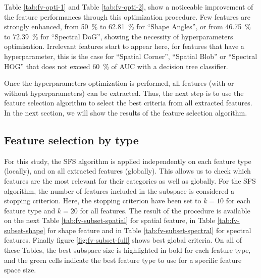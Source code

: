 \documentclass[../thesis.tex]{subfiles}
\begin{document}
    Table \ref{tab:fv-opti-1} and Table \ref{tab:fv-opti-2}, show a noticeable improvement of the feature performances through this optimization procedure. Few features are strongly enhanced, from \SI{50}{\percent} to \SI{62.81}{\percent} for ``Shape Angles'', or from \SI{46.75}{\percent} to \SI{72.39}{\percent} for ``Spectral DoG'', showing the necessity of hyperparameters optimisation. Irrelevant features start to appear here, for features that have a hyperparameter, this is the case for ``Spatial Corner'', ``Spatial Blob'' or ``Spectral HOG'' that does not exceed \SI{60}{\percent} of AUC with a decision tree classifier.
    
    Once the hyperparameters optimization is performed, all features (with or without hyperparameters) can be extracted. Thus, the next step is to use the feature selection algorithm to select the best criteria from all extracted features. In the next section, we will show the results of the feature selection algorithm.
    
    \subsection{Feature selection by type}
    
    For this study, the SFS algorithm is applied independently on each feature type (locally), and on all extracted features (globally). This allows us to check which features are the most relevant for their categories as well as globally. For the SFS algorithm, the number of features included in the subspace is considered a stopping criterion. Here, the stopping criterion have been set to $k=10$ for each feature type and $k=20$ for all features. The result of the procedure is available on the next Table \ref{tab:fv-subset-spatial} for spatial feature, in Table \ref{tab:fv-subset-shape} for shape feature and in Table \ref{tab:fv-subset-spectral} for spectral features. Finally figure \ref{fig:fv-subset-full} shows best global criteria. On all of these Tables, the best subspace size is highlighted in bold for each feature type, and the green cells indicate the best feature type to use for a specific feature space size.
    
    
\end{document}
